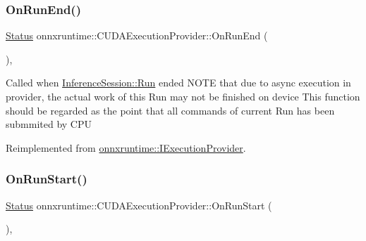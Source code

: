 \mbox{\label{classonnxruntime_1_1CUDAExecutionProvider_aad4464387bb09d2337e334d5a7325e5d}} 
\subsubsection{\texorpdfstring{On\+Run\+End()}{OnRunEnd()}}
{\footnotesize\ttfamily \mbox{\hyperlink{classonnxruntime_1_1common_1_1Status}{Status}} onnxruntime\+::\+C\+U\+D\+A\+Execution\+Provider\+::\+On\+Run\+End (\begin{DoxyParamCaption}{ }\end{DoxyParamCaption})\hspace{0.3cm}{\ttfamily [override]}, {\ttfamily [virtual]}}

Called when \mbox{\hyperlink{classonnxruntime_1_1InferenceSession_a90aa8b5fdc2638c4d2c45afc9c3ed222}{Inference\+Session\+::\+Run}} ended N\+O\+TE that due to async execution in provider, the actual work of this Run may not be finished on device This function should be regarded as the point that all commands of current Run has been submmited by C\+PU 

Reimplemented from \mbox{\hyperlink{classonnxruntime_1_1IExecutionProvider_a2a4b49018ff2509a01c1dd73b5cbb811}{onnxruntime\+::\+I\+Execution\+Provider}}.

\mbox{\label{classonnxruntime_1_1CUDAExecutionProvider_abf7e482aba687b89fcbd6586271ca753}} 
\subsubsection{\texorpdfstring{On\+Run\+Start()}{OnRunStart()}}
{\footnotesize\ttfamily \mbox{\hyperlink{classonnxruntime_1_1common_1_1Status}{Status}} onnxruntime\+::\+C\+U\+D\+A\+Execution\+Provider\+::\+On\+Run\+Start (\begin{DoxyParamCaption}{ }\end{DoxyParamCaption})\hspace{0.3cm}{\ttfamily [override]}, {\ttfamily [virtual]}}


